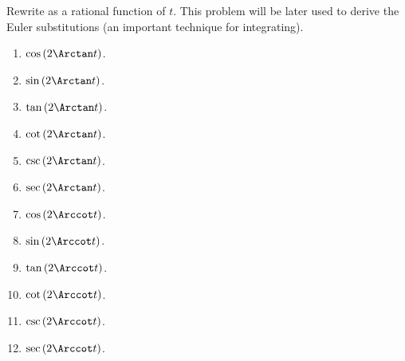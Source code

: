 Rewrite as a rational function of $t$. This problem will be later used to derive the Euler substitutions (an important technique for integrating).

\begin{multicols}{2}
\begin{enumerate}[ref={\fcProblemRef}]
\item \label{problemcos(2arctan t)} $\cos \left(2\Arctan t\right)$.

\item $\sin \left(2\Arctan t\right)$.

\item $\tan \left(2\Arctan t\right)$.

\item \label{problemcot(2arctan t)}  $\cot \left(2\Arctan t\right)$.

\item $\csc \left(2\Arctan t\right)$.

\item $\sec \left(2\Arctan t\right)$.

\item $\cos \left(2\Arccot t\right)$.

\item $\sin \left(2\Arccot t\right)$.

\item $\tan \left(2\Arccot t\right)$.

\item $\cot \left(2\Arccot t\right)$.

\item $\csc \left(2\Arccot t\right)$.

\item $\sec \left(2\Arccot t\right)$.

\end{enumerate}
\end{multicols}
